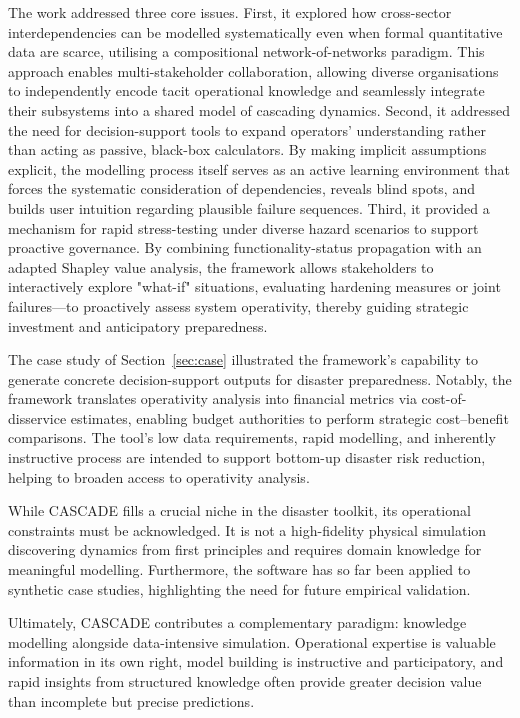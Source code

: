 \documentclass[review,12pt]{elsarticle}
\begin{document}
The work addressed three core issues. First, it explored how cross-sector interdependencies can be modelled systematically even when formal quantitative data are scarce, utilising a compositional network-of-networks paradigm. This approach enables multi-stakeholder collaboration, allowing diverse organisations to independently encode tacit operational knowledge and seamlessly integrate their subsystems into a shared model of cascading dynamics. Second, it addressed the need for decision-support tools to expand operators' understanding rather than acting as passive, black-box calculators. By making implicit assumptions explicit, the modelling process itself serves as an active learning environment that forces the systematic consideration of dependencies, reveals blind spots, and builds user intuition regarding plausible failure sequences. 
Third, it provided a mechanism for rapid stress-testing under diverse hazard scenarios to support proactive governance. By combining functionality-status propagation with an adapted Shapley value analysis, the framework allows stakeholders to interactively explore "what-if" situations, evaluating hardening measures or joint failures—to proactively assess system operativity, thereby guiding strategic investment and anticipatory preparedness.

The case study of Section~\ref{sec:case} illustrated the framework's capability to generate concrete decision-support outputs for disaster preparedness. Notably, the framework translates operativity analysis into financial metrics via cost-of-disservice estimates, enabling budget authorities to perform strategic cost--benefit comparisons. The tool's low data requirements, rapid modelling, and inherently instructive process are intended to support bottom-up disaster risk reduction, helping to broaden access to operativity analysis.

While CASCADE fills a crucial niche in the disaster toolkit, its operational constraints must be acknowledged. It is not a high-fidelity physical simulation discovering dynamics from first principles and requires domain knowledge for meaningful modelling. Furthermore, the software has so far been applied to synthetic case studies, highlighting the need for future empirical validation.

Ultimately, CASCADE contributes a complementary paradigm: knowledge modelling alongside data-intensive simulation. Operational expertise is valuable information in its own right, model building is instructive and participatory, and rapid insights from structured knowledge often provide greater decision value than incomplete but precise predictions.
\end{document}
